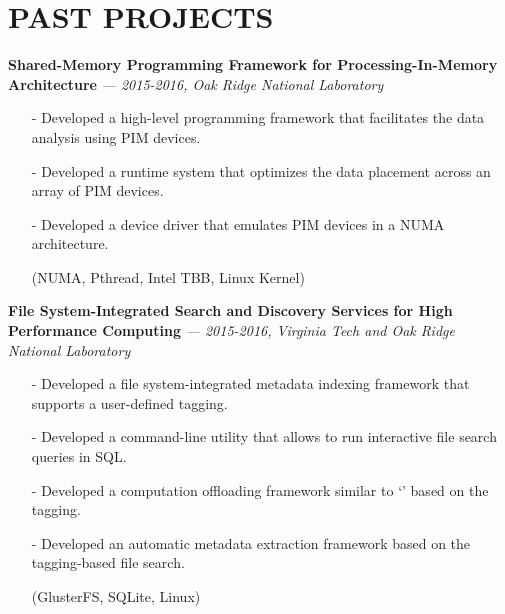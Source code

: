\section{PAST PROJECTS} 
\vspace{0.03in}
  {\bf Shared-Memory Programming Framework for Processing-In-Memory Architecture}
   {\it \footnotesize --- 2015-2016, Oak Ridge National Laboratory}
   \begin{itemize}[leftmargin=*]
    \setlength\itemsep{-0.02in}
    \item[-] Developed a high-level programming framework that
             facilitates the data analysis using PIM devices.
    \item[-] Developed a runtime system that optimizes the data placement across an array of
             PIM devices.
    \item[-] Developed a device driver that emulates PIM devices in a NUMA architecture.
    \item[] {\small(NUMA, Pthread, Intel TBB, Linux Kernel)}
   \end{itemize}
  \vspace{-0.15in}
  {\bf File System-Integrated Search and Discovery Services for High Performance Computing}
   {\it \footnotesize --- 2015-2016, Virginia Tech and Oak Ridge National Laboratory}
   \begin{itemize}[leftmargin=*]
    \setlength\itemsep{-0.02in}
    \item[-] Developed a file system-integrated metadata indexing framework
	     that supports a user-defined tagging.
    \item[-] Developed a command-line utility that allows to run interactive file search queries
             in SQL.
    \item[-] Developed a computation offloading framework similar to `'
	     based on the tagging.
    \item[-] Developed an automatic metadata
	     extraction framework based on the tagging-based file search.
    \item[] {\small(GlusterFS, SQLite, Linux)}
   \end{itemize}
